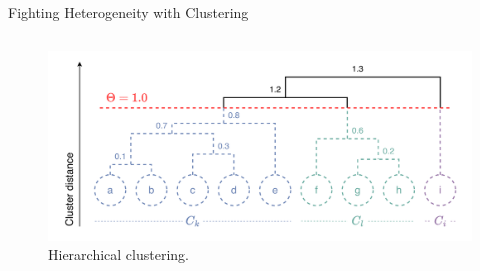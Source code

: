 \begin{frame}{Fighting Heterogeneity with Clustering}
\begin{columns}
      \begin{column}{.5\textwidth}
        \begin{figure}
          \centering
          \includegraphics[width=\textwidth]{figures/radar/clustering.drawio.pdf}
          \caption{Hierarchical clustering.}
        \end{figure}
      \end{column}
  \end{columns}
  \bigskip

\end{frame}

  



        
    
